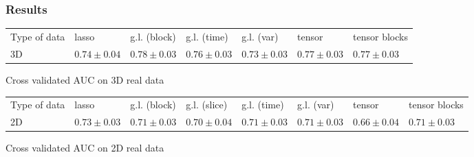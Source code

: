\documentclass{beamer}
\begin{document}
\begin{frame}
    \frametitle{Results}
    \begin{table}[H]
        \centering
        \label{tab:result_real}
        \renewcommand{\arraystretch}{1.2} 
        \begin{adjustbox}{center}
        \begin{tabular}{|>{\centering\arraybackslash}m{1.4cm}|>{\centering\arraybackslash}m{1.1cm}|>{\centering\arraybackslash}m{1.1cm}|>{\centering\arraybackslash}m{1.1cm}|>{\centering\arraybackslash}m{1.1cm}|>{\centering\arraybackslash}m{1.1cm}|>{\centering\arraybackslash}m{1.1cm}|}
            \cline{1-7}
            Type of data & lasso & g.l. (block) & g.l. (time)& g.l. (var) & tensor & tensor blocks\\
            \cline{1-7} 
            3D & $0.74 \pm 0.04$& $0.78 \pm 0.03$ & $0.76 \pm 0.03$ & $0.73 \pm 0.03$ & $0.77 \pm 0.03$ & $0.77 \pm 0.03$ \\
            \cline{1-7}
    
        \end{tabular}
        
    \end{adjustbox}
    \parbox{0.9\textwidth}{
    \vspace{0.2 cm}    
    \centering \small Cross validated AUC on 3D real data}
    \vspace{0.3 cm}
    
    \begin{adjustbox}{center}
    \begin{tabular}{|>{\centering\arraybackslash}m{1.2cm}|>{\centering\arraybackslash}m{1cm}|>{\centering\arraybackslash}m{1cm}|>{\centering\arraybackslash}m{1cm}|>{\centering\arraybackslash}m{1cm}|>{\centering\arraybackslash}m{1cm}|>{\centering\arraybackslash}m{1cm}|>{\centering\arraybackslash}m{1cm}|}
        \cline{1-8}
        Type of data & lasso & g.l. (block) & g.l. (slice)& g.l. (time)& g.l. (var) & tensor & tensor blocks\\
        \cline{1-8} 
        2D & $0.73 \pm 0.03$ & $0.71 \pm 0.03$ & $0.70 \pm 0.04$ & $0.71 \pm 0.03 $  & $0.71 \pm 0.03$ & $0.66 \pm 0.04$ & $0.71 \pm 0.03$ \\
        \cline{1-8}
    \end{tabular}
    \end{adjustbox}
    \parbox{0.9\textwidth}{
    \vspace{0.2 cm}    
    \centering \small Cross validated AUC on 2D real data}
    \end{table}
\end{frame}
\end{document}
